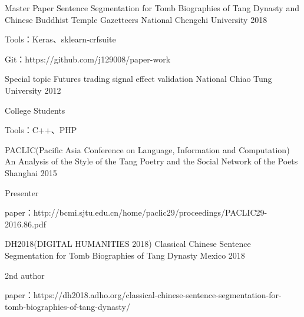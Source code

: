 

\begin{cventries}
  \cventry
    {Master Paper} %
    {Sentence Segmentation for Tomb Biographies of Tang Dynasty and Chinese Buddhist Temple Gazetteers} %
    {National Chengchi University} %
    {2018} %
    {
      \begin{cvitems} %
        \item {Tools：Keras、sklearn-crfsuite}
        \item {Git：https://github.com/j129008/paper-work}
      \end{cvitems}
    }

  \cventry
    {Special topic} %
    {Futures trading signal effect validation} %
    {National Chiao Tung University} %
    {2012} %
    {
      \begin{cvitems} %
        \item {College Students}
        \item {Tools：C++、PHP}
      \end{cvitems}
    }

  \cventry
    {PACLIC(Pacific Asia Conference on Language, Information and Computation)} %
    {An Analysis of the Style of the Tang Poetry and the Social Network of the Poets}
    {Shanghai} %
    {2015} %
    {
      \begin{cvitems} %
        \item {Presenter} %
        \item {paper：http://bcmi.sjtu.edu.cn/home/paclic29/proceedings/PACLIC29-2016.86.pdf}
      \end{cvitems}
    }


  \cventry
    {DH2018(DIGITAL HUMANITIES 2018)} %
    {Classical Chinese Sentence Segmentation for Tomb Biographies of Tang Dynasty} %
    {Mexico} %
    {2018} %
    {
      \begin{cvitems} %
      \item {2nd author} %
        \item {paper：https://dh2018.adho.org/classical-chinese-sentence-segmentation-for-tomb-biographies-of-tang-dynasty/}
      \end{cvitems}
    }

\end{cventries}
